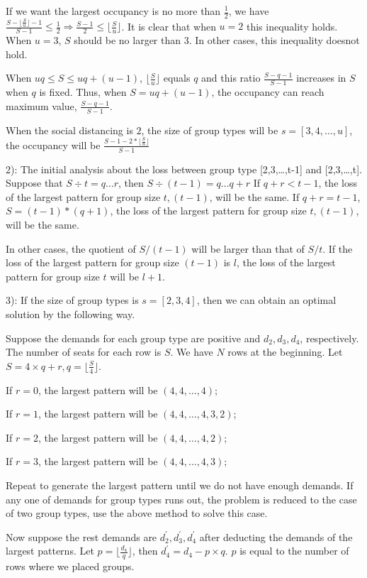 If we want the largest occupancy is no more than $\frac{1}{2}$, we have $\frac{S-\lfloor \frac{S}{u} \rfloor -1}{S-1} \leq \frac{1}{2} \Rightarrow \frac{S-1}{2} \leq \lfloor \frac{S}{u} \rfloor$. It is clear that when $u =2$ this inequality holds. When $u =3$, $S$ should be no larger than 3. In other cases, this inequality doesnot hold.

When $uq \leq S \leq uq + (u-1)$, $\lfloor \frac{S}{u} \rfloor$ equals $q$ and this ratio $\frac{S-q-1}{S-1}$ increases in $S$ when $q$ is fixed. Thus, when $S = uq + (u-1)$, the occupancy can reach maximum value, $\frac{S-q-1}{S-1}$.

When the social distancing is $2$, the size of group types will be $s = [3,4,\ldots,u]$, the occupancy will be $\frac{S-1-2*\lfloor \frac{S}{u} \rfloor}{S-1}$


2): The initial analysis about the loss between group type [2,3,\ldots,t-1] and [2,3,\ldots,t].
Suppose that $S \div t = q \ldots r$, then $S \div (t-1) = q \ldots q+r$
If $q+r < t-1$, the loss of the largest pattern for group size $t,(t-1)$, will be the same.
If $q+r = t-1$, $S = (t-1)* (q+1)$, the loss of the largest pattern for group size $t,(t-1)$, will be the same.

In other cases, the quotient of $S/(t-1)$ will be larger than that of $S/t$.
If the loss of the largest pattern for group size $(t-1)$ is $l$, the loss of the largest pattern for group size $t$ will be $l+1$.

3): If the size of group types is $s = [2,3,4]$, then we can obtain an optimal solution by the following way.

Suppose the demands for each group type are positive and $d_2,d_3,d_4$, respectively. The number of seats for each row is $S$. We have $N$ rows at the beginning. Let $S = 4 \times q +r, q = \lfloor \frac{S}{4} \rfloor$.

If $r = 0$, the largest pattern will be $(4,4,\ldots,4)$;

If $r = 1$, the largest pattern will be $(4,4,\ldots,4,3,2)$;

If $r = 2$, the largest pattern will be $(4,4,\ldots,4,2)$;

If $r = 3$, the largest pattern will be $(4,4,\ldots,4,3)$;

Repeat to generate the largest pattern until we do not have enough demands.
If any one of demands for group types runs out, the problem is reduced to the case of two group types, use the above method to solve this case.

Now suppose the rest demands are $d_2^{'},d_3^{'},d_4^{'}$ after deducting the demands of the largest patterns. Let $p = \lfloor \frac{d_4}{q} \rfloor$, then $d_4^{'} = d_4 - p \times q$. $p$ is equal to the number of rows where we placed groups.

